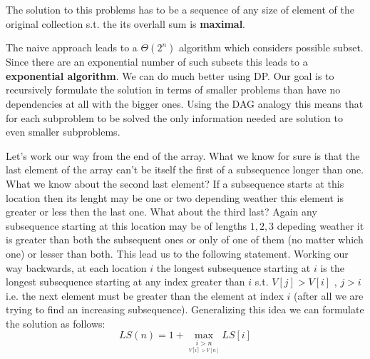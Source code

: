 The solution to this problems has to be a sequence of any size of element of the original collection s.t. the its overlall sum is \textbf{maximal}.

The naive approach leads to a $\Theta(2^n)$ algorithm which considers possible subset. Since there are an exponential number of such subsets this leads to a \textbf{exponential algorithm}.
We can do much better using DP.
Our goal is to recursively formulate the solution in terms of smaller problems than have no dependencies at all with the bigger ones.  Using the DAG analogy this means that for each subproblem to be solved the only information needed are solution to even smaller subproblems.

Let's work our way from the end of the array. What we know for sure is that the last element of the array can't be itself the first of a subsequence longer than one.
What we know about the second last element?
If a subsequence starts at this location then its lenght may be one or two depending weather this element is greater or less then the last one.
What about the third last? Again any subsequence starting at this location may be of lengths $1,2,3$ depeding weather it is greater than both the subsequent ones or only of one of them (no matter which one) or lesser than both.
This lead us to the following statement. Working our way backwards, at each location $i$ the longest subsequence starting at $i$ is the longest subsequence starting at any index greater than $i$ s.t. $V[j] > V[i]$ , $j>i$ i.e. the next element must be greater than the element at index $i$ (after all we are trying to find an increasing subsequence). 
Generalizing this idea we can formulate the solution as follows:
\[
LS(n) = 1+ \underset{ \underset{ V[i] > V[n]}{i > n} }{\max}{ LS[i]}
\]
 
